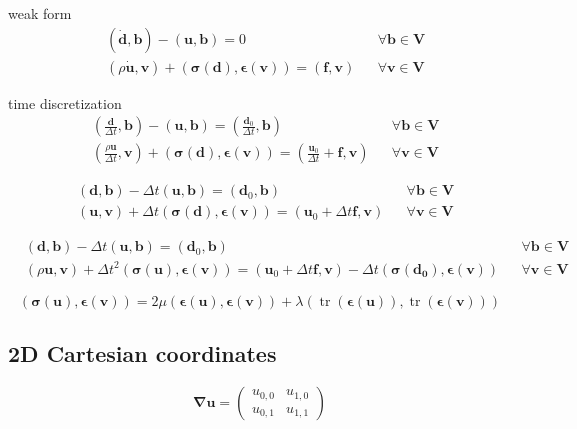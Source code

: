 \documentclass{scrartcl}
\newcommand{\vect}[1]{\boldsymbol{#1}}
\newcommand{\ten}[1]{\boldsymbol{#1}}
\DeclareMathOperator{\trace}{tr}
\begin{document}
weak form
\begin{align*}
&(\dot{\vect{d}},\vect{b}) - (\vect{u},\vect{b}) = 0 & &\forall \vect{b} \in \vect{V} \\
&(\rho \dot{\vect{u}},\vect{v}) + (\ten{\sigma}(\vect{d}),\ten{\epsilon}(\vect{v})) =
(\vect{f},\vect{v}) & &\forall \vect{v} \in \vect{V}
\end{align*}

time discretization
\begin{align*}
&\left(\frac{\vect{d}}{\Delta t},\vect{b}\right) - (\vect{u},\vect{b}) =
\left(\frac{\vect{d}_0}{\Delta t},\vect{b} \right) & &\forall \vect{b} \in \vect{V} \\
&\left(\frac{\rho \vect{u}}{\Delta t},\vect{v}\right)
+ (\ten{\sigma}(\vect{d}),\ten{\epsilon}(\vect{v})) =
\left(\frac{\vect{u}_0}{\Delta t} + \vect{f},\vect{v}\right) & &\forall \vect{v} \in \vect{V}
\end{align*}

\begin{align*}
&(\vect{d},\vect{b}) - \Delta t (\vect{u},\vect{b}) =
(\vect{d}_0,\vect{b}) & &\forall \vect{b} \in \vect{V} \\
&(\vect{u},\vect{v}) + \Delta t(\ten{\sigma}(\vect{d}),\ten{\epsilon}(\vect{v})) =
(\vect{u}_0 + \Delta t\vect{f},\vect{v}) & &\forall \vect{v} \in \vect{V}
\end{align*}

\begin{align*}
&(\vect{d},\vect{b}) - \Delta t (\vect{u},\vect{b}) =
(\vect{d}_0,\vect{b}) & &\forall \vect{b} \in \vect{V} \\
&( \rho \vect{u},\vect{v}) + \Delta t^2 (\ten{\sigma}(\vect{u}),\ten{\epsilon}(\vect{v})) =
(\vect{u}_0 + \Delta t\vect{f},\vect{v}) - \Delta t (\ten{\sigma}(\vect{d_0}),\ten{\epsilon}(\vect{v}))
& &\forall \vect{v} \in \vect{V}
\end{align*}

\[
(\ten{\sigma}(\vect{u}),\ten{\epsilon}(\vect{v})) = 
2\mu (\ten{\epsilon}(\vect{u}),\ten{\epsilon}(\vect{v})) +
\lambda (\trace(\ten{\epsilon}(\vect{u})),\trace(\ten{\epsilon}(\vect{v})))
\]

\subsection{2D Cartesian coordinates}

\[
\ten{\nabla u} =
\begin{pmatrix}
u_{0,0} & u_{1,0} \\
u_{0,1} & u_{1,1}
\end{pmatrix}
\]
\end{document}
